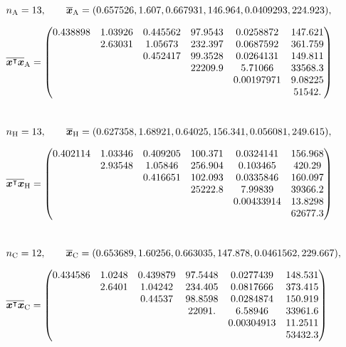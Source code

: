 \documentclass[\ifafour a4paper,12pt,\else a5paper,10pt,\fi%
onecolumn,oneside,article,%
british%
]{memoir}
\theoremstyle{remark}
\theoremstyle{innote}
\renewcommand*{\|}{\mathpunct{|}}
\newcommand*{\T}{^\intercal}%
\newcommand*{\yx}{x}
\newcommand*{\yxx}{\bm{\yx}}
\newcommand*{\ya}{\mathrm{A}}
\newcommand*{\yi}{\mathrm{C}}
\newcommand*{\yhe}{\mathrm{H}}
\newcommand*{\yn}{n}
\newcommand*{\yna}{\yn_{\ya}}
\newcommand*{\ynh}{\yn_{\yhe}}
\newcommand*{\yni}{\yn_{\yi}}
\newcommand*{\vxxa}{\overline{\yxx}_{\ya}}
\newcommand*{\vxta}{\overline{\yxx\T\yxx}_{\ya}}
\newcommand*{\vxxh}{\overline{\yxx}_{\yhe}}
\newcommand*{\vxth}{\overline{\yxx\T\yxx}_{\yhe}}
\newcommand*{\vxxi}{\overline{\yxx}_{\yi}}
\newcommand*{\vxti}{\overline{\yxx\T\yxx}_{\yi}}
\theoremstyle{plain}
\begin{document}
\begin{table}[!h]
  \centering\footnotesize
    \begin{equation*}
\begin{aligned}
  &\yna=13, \qquad
  \vxxa=(0.657526,1.607,0.667931,146.964,0.0409293,224.923),
  \\[2\jot]
  &\vxta=
  \begin{pmatrix}
0.438898 & 	1.03926 & 	0.445562 & 	97.9543 & 	0.0258872 & 	147.621 \\
 & 	2.63031 & 	1.05673 & 	232.397 & 	0.0687592 & 	361.759 \\
 & 	 & 	0.452417 & 	99.3528 & 	0.0264131 & 	149.811 \\
 & 	 & 	 & 	22209.9 & 	5.71066 & 	33568.3 \\
 & 	 & 	 & 	 & 	0.00197971 & 	9.08225 \\
 & 	 & 	 & 	 & 	 & 	51542. 
  \end{pmatrix}
  \\[8\jot]
  &\ynh=13, \qquad\vxxh=(0.627358,1.68921,0.64025,156.341,0.056081,249.615),
  \\[2\jot]
  &\vxth=
  \begin{pmatrix}
0.402114 & 	1.03346 & 	0.409205 & 	100.371 & 	0.0324141 & 	156.968 \\
 & 	2.93548 & 	1.05846 & 	256.904 & 	0.103465 & 	420.29 \\
 & 	 & 	0.416651 & 	102.093 & 	0.0335846 & 	160.097 \\
 & 	 & 	 & 	25222.8 & 	7.99839 & 	39366.2 \\
 & 	 & 	 & 	 & 	0.00433914 & 	13.8298 \\
 & 	 & 	 & 	 & 	 & 	62677.3 
  \end{pmatrix}
  \\[8\jot]
  &\yni=12, \qquad  \vxxi=(0.653689, 1.60256, 0.663035, 147.878, 0.0461562,
  229.667), \\[2\jot]
  &\vxti=
  \begin{pmatrix}
0.434586 & 	1.0248 & 	0.439879 & 	97.5448 & 	0.0277439 & 	148.531 \\
 & 	2.6401 & 	1.04242 & 	234.405 & 	0.0817666 & 	373.415 \\
 & 	 & 	0.44537 & 	98.8598 & 	0.0284874 & 	150.919 \\
 & 	 & 	 & 	22091. & 	6.58946 & 	33961.6 \\
 & 	 & 	 & 	 & 	0.00304913 & 	11.2511 \\
 & 	 & 	 & 	 & 	 & 	53432.3 
  \end{pmatrix}
\end{aligned}
\end{equation*}\bigskip
  \caption{Sufficient statistics from Claudia's data of
    table~\ref{tab:simones_data}.}
  \label{tab:simones_data_suff_stat}
\end{table}
\end{document}
